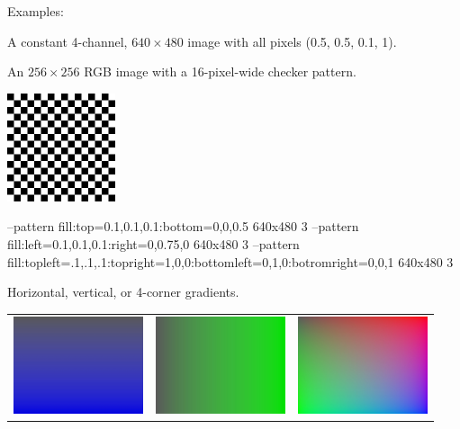 \noindent Examples:

\vspace{10pt}
A constant 4-channel, $640\times 480$ image with all pixels (0.5, 0.5,
0.1, 1).
\apiend

\vspace{10pt}
An $256 \times 256$ RGB image with a 16-pixel-wide checker pattern.

\spc \includegraphics[width=1.25in]{figures/checker.jpg} 
\apiend

\vspace{10pt}
\begin{tinycode}
--pattern fill:top=0.1,0.1,0.1:bottom=0,0,0.5 640x480 3
--pattern fill:left=0.1,0.1,0.1:right=0,0.75,0 640x480 3
--pattern fill:topleft=.1,.1,.1:topright=1,0,0:bottomleft=0,1,0:botromright=0,0,1 640x480 3
\end{tinycode}

\noindent Horizontal, vertical, or 4-corner gradients.

\noindent \begin{tabular}{lll}
\includegraphics[width=1.5in]{figures/gradient.jpg} &
 \includegraphics[width=1.5in]{figures/gradienth.jpg} &
 \includegraphics[width=1.5in]{figures/gradient4.jpg}
\end{tabular}


